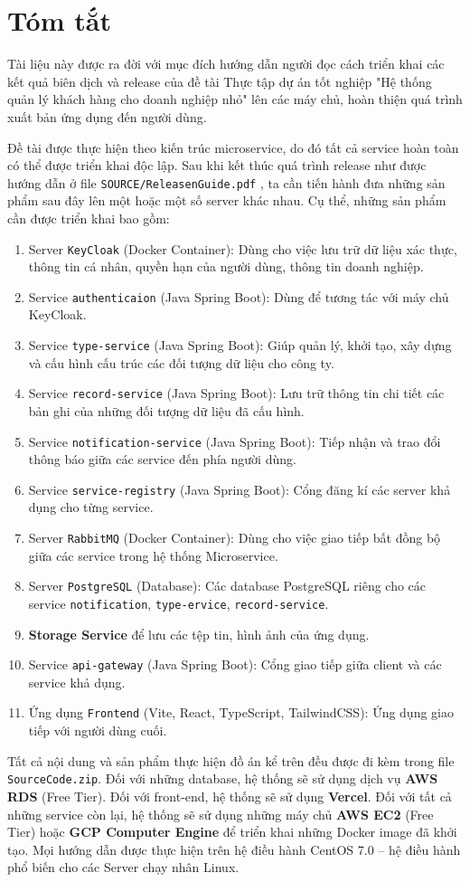 \chapter*{Tóm tắt}
\label{summary}
Tài liệu này được ra đời với mục đích hướng dẫn người đọc cách triển khai các kết quả biên dịch và release của đề tài Thực tập dự án tốt nghiệp "Hệ thống quản lý khách hàng cho doanh nghiệp nhỏ" lên các máy chủ, hoàn thiện quá trình xuất bản ứng dụng đến người dùng.

Đề tài được thực hiện theo kiến trúc microservice, do đó tất cả service hoàn toàn có thể được triển khai độc lập. Sau khi kết thúc quá trình release như được hướng dẫn ở file \texttt{SOURCE/ReleasenGuide.pdf} , ta cần tiến hành đưa những sản phẩm sau đây lên một hoặc một số server khác nhau.
Cụ thể, những sản phẩm cần được triển khai bao gồm:
\begin{enumerate}
    \item Server \texttt{KeyCloak} (Docker Container): Dùng cho việc lưu trữ dữ liệu xác thực, thông tin cá nhân, quyền hạn của người dùng, thông tin doanh nghiệp.
    \item Service \texttt{authenticaion} (Java Spring Boot): Dùng để tương tác với máy chủ KeyCloak.
    \item Service \texttt{type-service} (Java Spring Boot): Giúp quản lý, khởi tạo, xây dựng và cấu hình cấu trúc các đối tượng dữ liệu cho công ty.
    \item Service \texttt{record-service} (Java Spring Boot): Lưu trữ thông tin chi tiết các bản ghi của những đối tượng dữ liệu đã cấu hình.
    \item Service \texttt{notification-service} (Java Spring Boot): Tiếp nhận và trao đổi thông báo giữa các service đến phía người dùng.
    \item Service \texttt{service-registry} (Java Spring Boot): Cổng đăng kí các server khả dụng cho từng service.
    \item Server \texttt{RabbitMQ} (Docker Container): Dùng cho việc giao tiếp bất đồng bộ giữa các service trong hệ thống Microservice.
    \item Server \texttt{PostgreSQL} (Database): Các database PostgreSQL riêng cho các service \texttt{notification}, \texttt{type-ervice}, \texttt{record-service}.
    \item \textbf{Storage Service} để lưu các tệp tin, hình ảnh của ứng dụng.
    \item Service \texttt{api-gateway} (Java Spring Boot): Cổng giao tiếp giữa client và các service khả dụng.
    \item Ứng dụng \texttt{Frontend} (Vite, React, TypeScript, TailwindCSS): Ứng dụng giao tiếp với người dùng cuối.
\end{enumerate}

Tất cả nội dung và sản phẩm thực hiện đồ án kể trên đều được đi kèm trong file \texttt{SourceCode.zip}. Đối với những database, hệ thống sẽ sử dụng dịch vụ \textbf{AWS RDS} (Free Tier).
Đối với front-end, hệ thống sẽ sử dụng \textbf{Vercel}. Đối với tất cả những service còn lại, hệ thống sẽ sử dụng những máy chủ \textbf{AWS EC2} (Free Tier) hoặc \textbf{GCP Computer Engine} để triển khai những Docker image đã khởi tạo.
Mọi hướng dẫn được thực hiện trên hệ điều hành CentOS 7.0 -- hệ điều hành phổ biến cho các Server chạy nhân Linux.